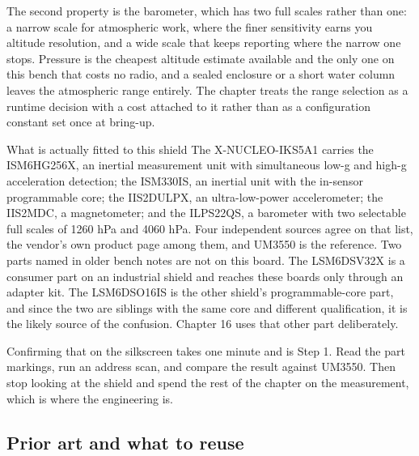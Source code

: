 The second property is the barometer, which has two full scales rather than one:
a narrow scale for atmospheric work, where the finer sensitivity earns you
altitude resolution, and a wide scale that keeps reporting where the narrow one
stops. Pressure is the cheapest altitude estimate available and the only one on
this bench that costs no radio, and a sealed enclosure or a short water column
leaves the atmospheric range entirely. The chapter treats the range selection as
a runtime decision with a cost attached to it rather than as a configuration
constant set once at bring-up.

\begin{note}{What is actually fitted to this shield}
The X-NUCLEO-IKS5A1 carries the ISM6HG256X, an inertial measurement unit with
simultaneous low-g and high-g acceleration detection; the ISM330IS, an inertial
unit with the in-sensor programmable core; the IIS2DULPX, an ultra-low-power
accelerometer; the IIS2MDC, a magnetometer; and the ILPS22QS, a barometer with
two selectable full scales of 1260 hPa and 4060 hPa. Four independent sources
agree on that list, the vendor's own product page among them, and UM3550 is the
reference. Two parts named in older bench notes are not on this board. The
LSM6DSV32X is a consumer part on an industrial shield and reaches these boards
only through an adapter kit. The LSM6DSO16IS is the other shield's
programmable-core part, and since the two are siblings with the same core and
different qualification, it is the likely source of the confusion. Chapter 16
uses that other part deliberately.
\end{note}

Confirming that on the silkscreen takes one minute and is Step 1. Read the part
markings, run an address scan, and compare the result against UM3550. Then stop
looking at the shield and spend the rest of the chapter on the measurement,
which is where the engineering is.

\subsection*{Prior art and what to reuse}

